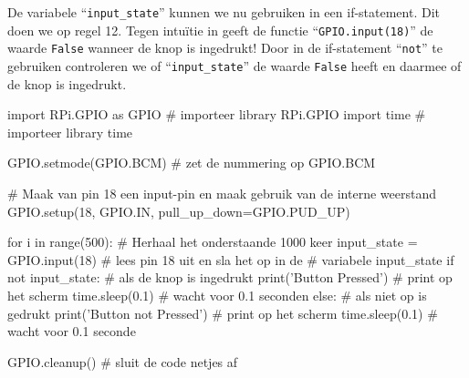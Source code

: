\documentclass{guide}
\begin{document}
De variabele \enquote{\texttt{input\_state}} kunnen we nu gebruiken in een if-statement. Dit doen we op regel 12. Tegen intu\"{i}tie in geeft de functie \enquote{\texttt{GPIO.input(18)}} de waarde \texttt{False} wanneer de knop is ingedrukt! Door in de if-statement \enquote{\texttt{not}} te gebruiken controleren we of \enquote{\texttt{input\_state}} de waarde \texttt{False} heeft en daarmee of de knop is ingedrukt.

\begin{python}[caption={De GPIO library inladen}, label=code:PIN_uitlezen]
import RPi.GPIO as GPIO           # importeer library RPi.GPIO
import time                       # importeer library time

GPIO.setmode(GPIO.BCM)            # zet de nummering op GPIO.BCM

# Maak van pin 18 een input-pin en maak gebruik van de interne weerstand
GPIO.setup(18, GPIO.IN, pull_up_down=GPIO.PUD_UP) 

for i in range(500):              # Herhaal het onderstaande 1000 keer
    input_state = GPIO.input(18)  # lees pin 18 uit en sla het op in de
                                  # variabele input_state
    if not input_state:           # als de knop is ingedrukt
        print('Button Pressed')   # print op het scherm
        time.sleep(0.1)           # wacht voor 0.1 seconden
  else:                           # als niet op is gedrukt
      print('Button not Pressed') # print op het scherm
        time.sleep(0.1)           # wacht voor 0.1 seconde

GPIO.cleanup()                    # sluit de code netjes af
\end{python}
\end{document}
